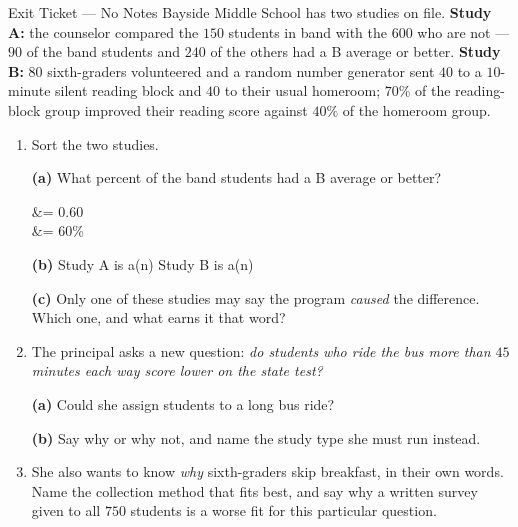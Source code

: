 \documentclass[10pt]{article}
\begin{document}

\vspace{0.15in}

\begin{notesbox}{Exit Ticket --- No Notes}
\small
Bayside Middle School has two studies on file. \textbf{Study A:} the counselor
compared the $150$ students in band with the $600$ who are not --- $90$ of the
band students and $240$ of the others had a B average or better. \textbf{Study
B:} $80$ sixth-graders volunteered and a random number generator sent $40$ to a
$10$-minute silent reading block and $40$ to their usual homeroom; $70\%$ of the
reading-block group improved their reading score against $40\%$ of the homeroom
group.

\begin{enumerate}[leftmargin=1.6em, itemsep=8pt, topsep=3pt]

  \item Sort the two studies.

        \textbf{(a)} What percent of the band students had a B average or
        better?

        \begin{work}
           &= 0.60 \\
                          &= 60\%
        \end{work}

        \textbf{(b)} Study A is a(n) \blank{3.2cm} \hfill Study B is a(n)
        \blank{3.2cm}

        \textbf{(c)} Only one of these studies may say the program
        \emph{caused} the difference. Which one, and what earns it that word?

  \item The principal asks a new question: \emph{do students who ride the bus
        more than $45$ minutes each way score lower on the state test?}

        \textbf{(a)} Could she assign students to a long bus ride? \blank{2cm}

        \textbf{(b)} Say why or why not, and name the study type she must run
        instead. \writeline

  \item She also wants to know \emph{why} sixth-graders skip breakfast, in their
        own words. Name the collection method that fits best, and say why a
        written survey given to all $750$ students is a worse fit for this
        particular question.

\end{enumerate}
\end{notesbox}
\end{document}

